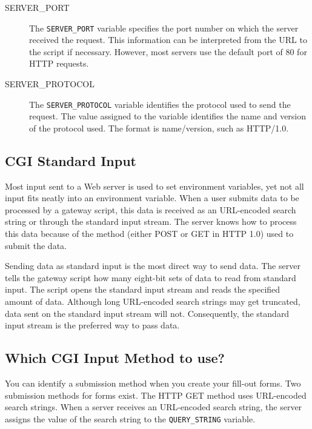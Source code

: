 \begin{description}
\item[SERVER\_PORT]

The \verb|SERVER_PORT| variable specifies the port number on which the server received
the request. This information can be interpreted from the URL to the script if
necessary. However, most servers use the default port of 80 for HTTP requests.

\item[SERVER\_PROTOCOL]

The \verb|SERVER_PROTOCOL| variable identifies the protocol used to send the
request. The value assigned to the variable identifies the name and
version of the protocol used. The format is name/version, such as
HTTP/1.0. 

%

\end{description}

\subsection{CGI Standard Input}

Most input sent to a Web server is used to set environment variables, yet
not all input fits neatly into an environment variable. When a user
submits data to be processed by a gateway script, this data is received as
an URL-encoded search string or through the standard input stream. The
server knows how to process this data because of the method (either POST
or GET in HTTP 1.0) used to submit the data.

Sending data as standard input is the most direct way to send data. The
server tells the gateway script how many eight-bit sets of data to read
from standard input. The script opens the standard input stream and reads
the specified amount of data. Although long URL-encoded search strings may
get truncated, data sent on the standard input stream will not.
Consequently, the standard input stream is the preferred way to pass data.

\subsection{Which CGI Input Method to use?}

You can identify a submission method when you create your fill-out forms.
Two submission methods for forms exist. The HTTP GET
method uses URL-encoded search strings. When a server receives an
URL-encoded search string, the server assigns the value of the search
string to the \verb|QUERY_STRING| variable.

